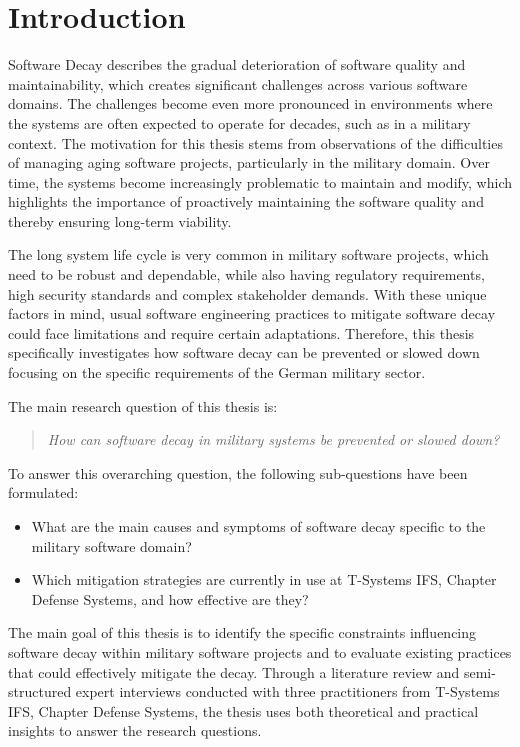 \section{Introduction}
Software Decay describes the gradual deterioration of software quality and maintainability, which creates significant challenges across various software domains.
The challenges become even more pronounced in environments where the systems are often expected to operate for decades, such as in a military context.
The motivation for this thesis stems from observations of the difficulties of managing aging software projects, particularly in the military domain.
Over time, the systems become increasingly problematic to maintain and modify, which highlights the importance of proactively maintaining the software quality and thereby ensuring long-term viability.

The long system life cycle is very common in military software projects, which need to be robust and dependable, while also having regulatory requirements,
high security standards and complex stakeholder demands. With these unique factors in mind, usual software engineering practices to mitigate software decay 
could face limitations and require certain adaptations. Therefore, this thesis specifically investigates how software decay can be prevented or slowed down
focusing on the specific requirements of the German military sector.

The main research question of this thesis is:
\begin{quote}
    \textit{How can software decay in military systems be prevented or slowed down?}
\end{quote}
To answer this overarching question, the following sub-questions have been formulated:
\begin{itemize}
    \item What are the main causes and symptoms of software decay specific to the military software domain?
    \item Which mitigation strategies are currently in use at T-Systems IFS, Chapter Defense Systems, and how effective are they?
\end{itemize}
The main goal of this thesis is to identify the specific constraints influencing software decay within military software projects and to evaluate existing practices that could effectively mitigate the decay.
Through a literature review and semi-structured expert interviews conducted with three practitioners from T-Systems IFS, Chapter Defense Systems, the thesis uses both theoretical and practical insights to answer the research questions.

